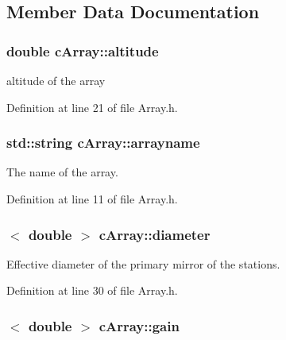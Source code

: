 \subsection{Member Data Documentation}
\hypertarget{classcArray_a463ca1e9dcdf170d0e58bd937fdf2369}{
\subsubsection[{altitude}]{\setlength{\rightskip}{0pt plus 5cm}double {\bf cArray::altitude}}}
\label{classcArray_a463ca1e9dcdf170d0e58bd937fdf2369}


altitude of the array 



Definition at line 21 of file Array.h.

\hypertarget{classcArray_a06fe8c046d4fbc0683787ab848d481fd}{
\subsubsection[{arrayname}]{\setlength{\rightskip}{0pt plus 5cm}std::string {\bf cArray::arrayname}}}
\label{classcArray_a06fe8c046d4fbc0683787ab848d481fd}


The name of the array. 



Definition at line 11 of file Array.h.

\hypertarget{classcArray_a80f01dfdf1b0acdef41d79ce888ae12c}{
\subsubsection[{diameter}]{$<$ double $>$ {\bf cArray::diameter}}}
\label{classcArray_a80f01dfdf1b0acdef41d79ce888ae12c}


Effective diameter of the primary mirror of the stations. 



Definition at line 30 of file Array.h.

\hypertarget{classcArray_a2a642c899d67cfeb5dc87d4e5adf0f3f}{
\subsubsection[{gain}]{$<$ double $>$ {\bf cArray::gain}}}
\label{classcArray_a2a642c899d67cfeb5dc87d4e5adf0f3f}


